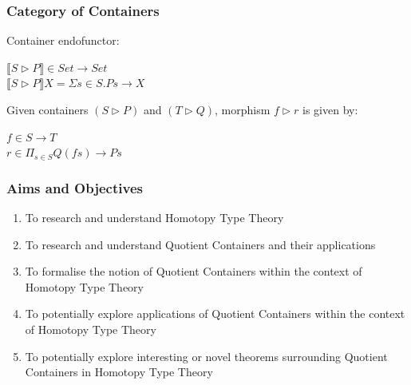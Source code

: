 \documentclass{beamer}
\begin{document}

\begin{frame}
\frametitle{Category of Containers}

Container endofunctor:\\
\begin{center}
$\llbracket S \rhd P\rrbracket \in Set \to Set$\\
$ \llbracket S \rhd P\rrbracket X = \Sigma s \in S. P s \to X $\\
\end{center}
\medskip
Given containers $ (S \rhd P)$ and $ (T \rhd Q)$, morphism $ f \rhd r $ is given by:\\
\medskip
\begin{center}
$f \in S \to T$\\
$r \in \Pi _{s \in S} Q(f s) \to P s $
\end{center}



\end{frame}


\begin{frame}
\frametitle{Aims and Objectives}
\begin{enumerate}
\item To research and understand Homotopy Type Theory
\item To research and understand Quotient Containers and their applications
\item To formalise the notion of Quotient Containers within the context of Homotopy Type Theory
\item To potentially explore applications of Quotient Containers within the context of Homotopy Type Theory
\item To potentially explore interesting or novel theorems surrounding Quotient Containers in Homotopy Type Theory
\end{enumerate}
\end{frame}

\end{document}
